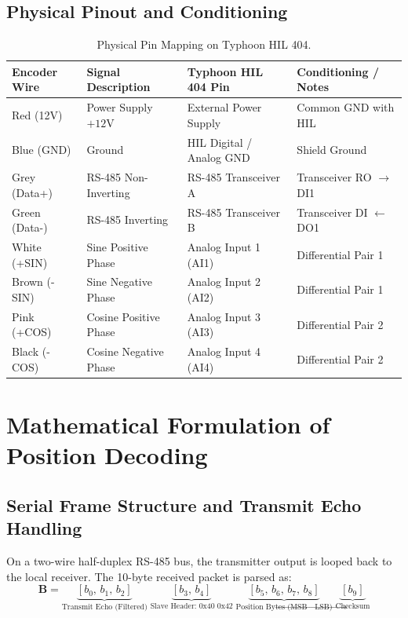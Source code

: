 \documentclass[11pt,a4paper]{article}
\begin{document}
\subsection{Physical Pinout and Conditioning}
\begin{table}[h!]
\centering
\begin{tabular}{@{}llll@{}}
\toprule
\textbf{Encoder Wire} & \textbf{Signal Description} & \textbf{Typhoon HIL 404 Pin} & \textbf{Conditioning / Notes} \\ \midrule
Red (12V) & Power Supply $+12\text{V}$ & External Power Supply & Common GND with HIL \\
Blue (GND) & Ground & HIL Digital / Analog GND & Shield Ground \\
Grey (Data+) & RS-485 Non-Inverting & RS-485 Transceiver A & Transceiver RO $\to$ DI1 \\
Green (Data-) & RS-485 Inverting & RS-485 Transceiver B & Transceiver DI $\leftarrow$ DO1 \\
White (+SIN) & Sine Positive Phase & Analog Input 1 (AI1) & Differential Pair 1 \\
Brown (-SIN) & Sine Negative Phase & Analog Input 2 (AI2) & Differential Pair 1 \\
Pink (+COS) & Cosine Positive Phase & Analog Input 3 (AI3) & Differential Pair 2 \\
Black (-COS) & Cosine Negative Phase & Analog Input 4 (AI4) & Differential Pair 2 \\ \bottomrule
\end{tabular}
\caption{Physical Pin Mapping on Typhoon HIL 404.}
\end{table}

\section{Mathematical Formulation of Position Decoding}

\subsection{Serial Frame Structure and Transmit Echo Handling}
On a two-wire half-duplex RS-485 bus, the transmitter output is looped back to the local receiver. The 10-byte received packet is parsed as:
\begin{equation}
\mathbf{B} = \underbrace{[b_0,\, b_1,\, b_2]}_{\text{Transmit Echo (Filtered)}} \; \underbrace{[b_3,\, b_4]}_{\text{Slave Header: 0x40 0x42}} \; \underbrace{[b_5,\, b_6,\, b_7,\, b_8]}_{\text{Position Bytes (MSB}\to\text{LSB)}} \; \underbrace{[b_9]}_{\text{Checksum}}
\end{equation}
\end{document}
